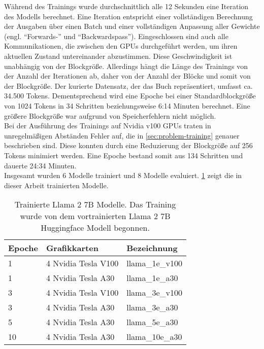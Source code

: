 Während des Trainings wurde durchschnittlich alle 12 Sekunden eine Iteration des Modells berechnet.
Eine Iteration entspricht einer vollständigen Berechnung der Ausgaben über einen Batch und einer vollständigen Anpassung aller Gewichte (engl. \enquote{Forwards-} und \enquote{Backwardspass}).
Eingeschlossen sind auch alle Kommunikationen, die zwischen den GPUs durchgeführt werden, um ihren aktuellen Zustand untereinander abzustimmen.
Diese Geschwindigkeit ist unabhängig von der Blockgröße.
Allerdings hängt die Länge des Trainings von der Anzahl der Iterationen ab, daher von der Anzahl der Blöcke und somit von der Blockgröße.
Der kurierte Datensatz, der das Buch \citet{bb} repräsentiert, umfasst ca. 34.500 Tokens.
Dementsprechend wird eine Epoche bei einer Standardblockgröße von 1024 Tokens in 34 Schritten beziehungsweise 6:14 Minuten berechnet.
Eine größere Blockgröße war aufgrund von Speicherfehlern nicht möglich.\\

Bei der Ausführung des Trainings auf Nvidia v100 GPUs traten in unregelmäßigen Abständen Fehler auf, die in \cref{sec:problem-training} genauer beschrieben sind.
Diese konnten durch eine Reduzierung der Blockgröße auf 256 Tokens minimiert werden. Eine Epoche bestand somit aus 134 Schritten und dauerte 24:34 Minuten.\\

Insgesamt wurden 6 Modelle trainiert und 8 Modelle evaluiert.
\cref{tab:trained-models} zeigt die in dieser Arbeit trainierten Modelle.
\begin{table}
    \centering
    \begin{tabular}{lll}
        \toprule
        \textbf{Epoche} & \textbf{Grafikkarten} & \textbf{Bezeichnung} \\
        \midrule
        1               & 4 Nvidia Tesla V100   & llama\_1e\_v100      \\
        1               & 4 Nvidia Tesla A30    & llama\_1e\_a30       \\
        3               & 4 Nvidia Tesla V100   & llama\_3e\_v100      \\
        3               & 4 Nvidia Tesla A30    & llama\_3e\_a30       \\
        5               & 4 Nvidia Tesla A30    & llama\_5e\_a30       \\
        10              & 4 Nvidia Tesla A30    & llama\_10e\_a30      \\
        \bottomrule
    \end{tabular}
    \caption[Trainierte Llama 2 7B Modelle]{Trainierte Llama 2 7B Modelle. Das Training wurde von dem vortrainierten Llama 2 7B Huggingface Modell begonnen.}\label{tab:trained-models}
\end{table}

